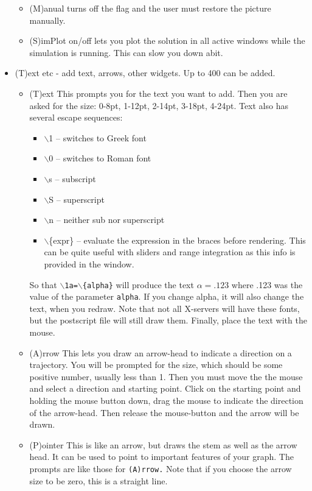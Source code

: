 \documentclass{article}
\begin{document}
\begin{itemize}
\begin{itemize}
\item (M)anual turns off the flag and the user must restore the picture manually.
\item (S)imPlot on/off lets you plot the solution in all active
windows while the simulation is running. This can slow you down abit.
\end{itemize}
\item (T)ext etc - add text, arrows, other widgets. Up to 400 can be added. 
\begin{itemize}
\item (T)ext This prompts you for the text you want to add.  Then you
are asked for the size: 0-8pt, 1-12pt, 2-14pt,
3-18pt, 4-24pt. Text also has several escape sequences:
\begin{itemize}
\item $\backslash$1 -- switches to Greek font 
\item $\backslash$0 -- switches to Roman font 
\item $\backslash$s -- subscript
\item $\backslash$S -- superscript
\item  $\backslash$n -- neither sub nor superscript
\item $\backslash$\{expr\} -- evaluate the expression in the braces before   rendering. This can be quite useful with sliders and range integration as this info is provided in the window.
\end{itemize}
So that {\tt $\backslash$1a=$\backslash$\{alpha\}} will produce the text $\alpha=.123$ where .123 was the value of the parameter {\tt alpha}. If you change alpha, it will also change the text, when you redraw. 
Note that not all X-servers will have these fonts, but the
postscript file will still draw them. Finally, place the text with the
mouse.
\item (A)rrow This lets you draw an arrow-head to indicate a direction
on a trajectory.  You will be prompted for the size, which should be
some positive number, usually less than 1.  Then you must move the the
mouse and select a direction and starting point.  Click on the
starting point and holding the mouse button down, drag the mouse to
indicate the direction of the arrow-head. Then release the
mouse-button and the arrow will be drawn.  
\item (P)ointer This is like an arrow, but draws the stem as well as
the arrow head.  It can be used to point to important features of your
graph. The prompts are like those for {\tt (A)rrow.} Note that if you choose the arrow size to be zero, this is a straight line. 

\end{itemize}
\end{itemize}
\end{document}
